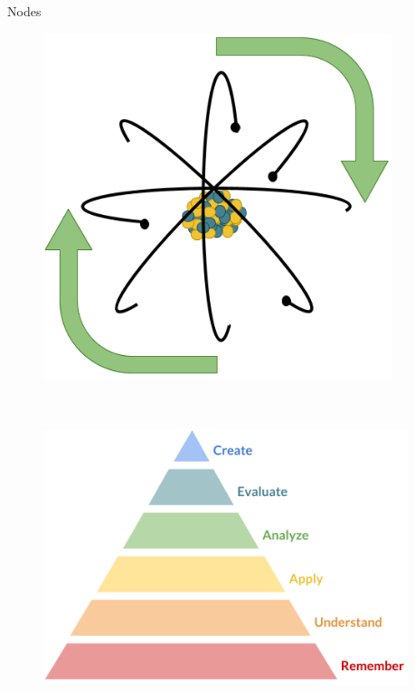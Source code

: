 \documentclass[final]{beamer}
\newlength{\sepwid}
\newlength{\onecolwid}
\newlength{\threecolwid}
\begin{document}
\begin{frame}[t]
\begin{columns}[t,totalwidth=\threecolwid]
\begin{column}{\onecolwid}
\begin{block}{Nodes}
	\begin{figure}
		\includegraphics[height=4in]{necx.png}
		\includegraphics[height=4in]{bloom.png}
	\end{figure}


\end{block}




\end{column} %

\begin{column}{\sepwid}\end{column} %




\end{columns}
\end{frame}
\end{document}
